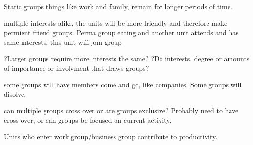 
Static groups things like work and family, remain for longer periods of time.

multiple interests alike, the units will be more friendly and therefore make permient friend groups.
Perma group eating and another unit attends and has same interests, this unit will join group

?Larger groups require more interests the same?
?Do interests, degree or amounts of importance or involvment that draws groups?

some groups will have members come and go, like companies. 
Some groups will disolve.

can multiple groups cross over or are groups exclusive? Probably need to have cross over, or can groups be focused on current activity.


Units who enter work group/business group contribute to productivity. 




